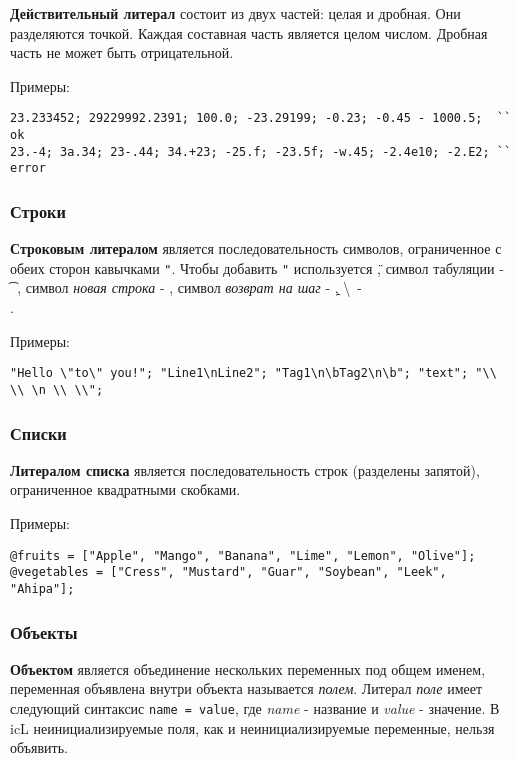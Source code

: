 {\bf Действительный литерал} состоит из двух частей: целая и дробная. Они разделяются точкой. Каждая составная часть является целом числом. Дробная часть не может быть отрицательной.

\noindent Примеры:
\begin{verbatim}
23.233452; 29229992.2391; 100.0; -23.29199; -0.23; -0.45 - 1000.5;  `` ok
23.-4; 3а.34; 23-.44; 34.+23; -25.f; -23.5f; -w.45; -2.4e10; -2.E2; `` error
\end{verbatim}

\subsubsection{Строки}

{\bf Строковым литералом} является последовательность символов, ограниченное с обеих сторон кавычками \texttt{"}. Чтобы добавить \texttt{"} используется \texttt{\"}, символ табуляции - \texttt{\t}, символ {\it новая строка} - \texttt{\n}, символ {\it возврат на шаг} - \texttt{\b}, \textbackslash \ - \texttt{\\}.

\noindent Примеры:
\begin{verbatim}
"Hello \"to\" you!"; "Line1\nLine2"; "Tag1\n\bTag2\n\b"; "text"; "\\ \\ \n \\ \\";
\end{verbatim}

\subsubsection{Списки}

{\bf Литералом списка} является последовательность строк (разделены запятой), ограниченное квадратными скобками.

\noindent Примеры:
\begin{verbatim}
@fruits = ["Apple", "Mango", "Banana", "Lime", "Lemon", "Olive"];
@vegetables = ["Cress", "Mustard", "Guar", "Soybean", "Leek", "Ahipa"];
\end{verbatim}

\subsubsection{Объекты}

{\bf Объектом} является объединение нескольких переменных под общем именем, переменная объявлена внутри объекта называется {\it полем}. Литерал {\it поле} имеет следующий синтаксис \texttt{name = value}, где  {\it name} - название и {\it value} - значение. В icL неинициализируемые поля, как и неинициализируемые переменные, нельзя объявить.

